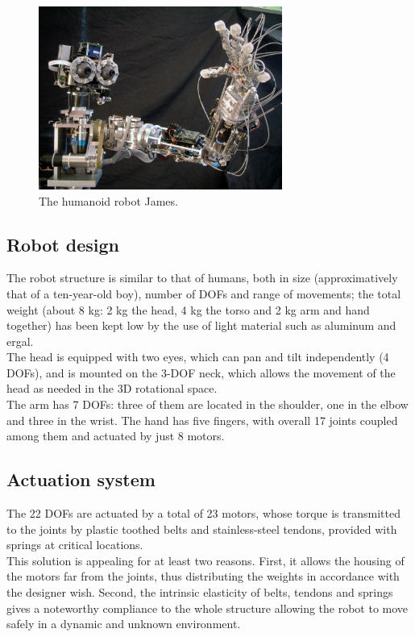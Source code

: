 \documentclass[conference]{IEEEtran}
\numberwithin{equation}{section}
\begin{document}
\begin{figure}[h!tbp]
\centering
\includegraphics[width=80mm]{image/James1.png}
\caption{The humanoid robot James.}
\label{Fig:PicureJames}
\end{figure}

\subsection{Robot design}

The robot structure is similar to that of humans, both in size (approximatively that of a ten-year-old boy), number of DOFs and range of movements; the total weight (about 8 kg: 2 kg the head, 4 kg the torso and 2 kg arm and hand together) has been kept low by the use of light material such as aluminum and ergal.\\The head is equipped with two eyes, which can pan and tilt independently (4 DOFs), and is mounted on the 3-DOF neck, which allows the movement of the head as needed in the 3D rotational space.\\The arm has 7 DOFs: three of them are located in the shoulder, one in the elbow and three in the wrist. The hand has five fingers, with overall 17 joints coupled among them and actuated by just 8 motors.


\subsection{Actuation system}

The 22 DOFs are actuated by a total of 23 motors, whose torque is transmitted to the joints by plastic toothed belts and stainless-steel tendons, provided with springs at critical locations.\\This solution is appealing for at least two reasons. First, it allows the housing of the motors far from the joints, thus distributing the weights in accordance with the designer wish. Second, the intrinsic elasticity of belts, tendons and springs gives a noteworthy compliance to the whole structure allowing the robot to move safely in a dynamic and unknown environment.
\end{document}
